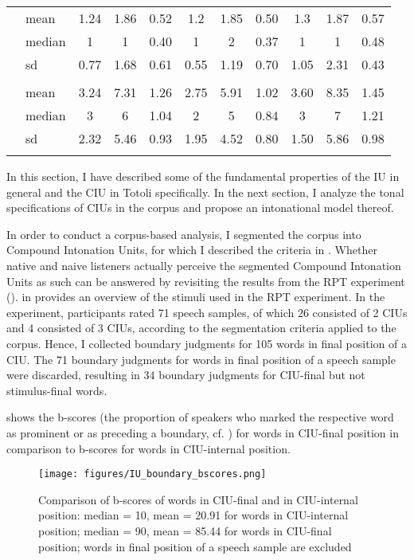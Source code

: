 \begin{table}
\begin{tabular}{l@{~~}l *9{S[table-format=1.2]}}
		& mean &1.24 &1.86 &0.52 &1.2 &1.85 &0.50 &1.3 &1.87 &0.57 \\
		& median & 1& 1&0.40 &1 &2 &0.37 &1 &1 & 0.48\\
		& sd &0.77 &1.68 & 0.61&0.55 &1.19 &0.70 &1.05 &2.31 & 0.43\\ \addlinespace
		  \\
		& mean & 3.24&7.31 &1.26 &2.75 & 5.91&1.02 &3.60 &8.35 &1.45 \\
		& median & 3& 6&1.04 &2 &5 &0.84 &3 &7 &1.21 \\
		& sd & 2.32& 5.46&0.93 &1.95 &4.52 &0.80 &1.50 &5.86 &0.98 \\
		\lspbottomrule
	\end{tabular}
\end{table}


In this section, I have described some of the fundamental properties of the IU in general and the CIU in Totoli specifically. In the next section, I analyze the tonal specifications of CIUs in the corpus and propose an intonational model thereof. 



In order to conduct a corpus-based analysis, I segmented the corpus into Compound Intonation Units, for which I described the criteria in . Whether native and naive listeners actually perceive the segmented Compound Intonation Units as such can be answered by revisiting the results from the RPT experiment ().  in  provides an overview of the stimuli used in the RPT experiment. In the experiment, participants rated 71 speech samples, of which 26 consisted of 2 CIUs and 4 consisted of 3 CIUs, according to the segmentation criteria applied to the corpus. Hence, I collected boundary judgments for 105 words in final position of a CIU. The 71 boundary judgments for words in final position of a speech sample were discarded, resulting in 34 boundary judgments for CIU-final but not stimulus-final words.

 shows the b-scores (the proportion of speakers who marked the respective word as prominent or as preceding a boundary, cf.  ) for words in CIU-final position in comparison to b-scores for words in CIU-internal position. 


\begin{figure}
	\texttt{[image: figures/IU\_boundary\_bscores.png]}
	\caption{Comparison of b-scores of words in CIU-final and in CIU-internal position: median = 10, mean = 20.91 for words in CIU-internal position; median = 90, mean = 85.44 for words in CIU-final position; words in final position of a speech sample are excluded}
	\label{bscore_IU}
\end{figure}


